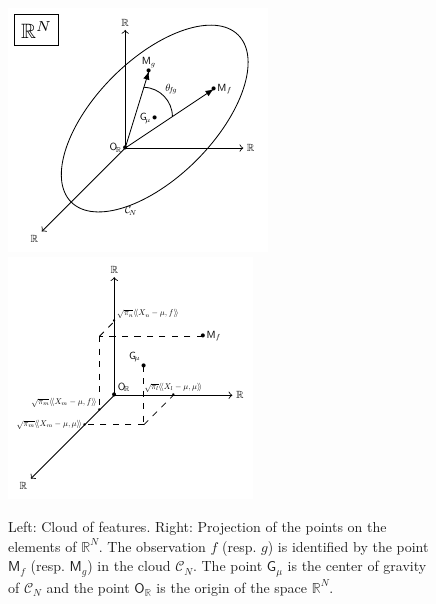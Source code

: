 \documentclass[times,sort&compress,3p]{elsarticle}
\theoremstyle{plain}%
\theoremstyle{definition}
\newcommand{\RR}{\mathbb{R}} %
\newcommand{\CN}{\mathcal{C}_{\!N}} %
\newcommand{\pfea}[1]{\mathsf{#1}} %
\newcommand{\Gfea}{\pfea{G}_{\!\mu}} %
\newcommand{\OG}{\pfea{O}_{\!\RR}} %
\begin{document}
\begin{figure}
    \centering
    \includegraphics[scale=1.2]{cloud_features.pdf}
    \includegraphics[scale=1.2]{cloud_features_proj.pdf}
    \caption{Left: Cloud of features. Right: Projection of the points on the elements of $\RR^N$. The observation $f$ (resp. $g$) is identified by the point $\pfea{M}_f$ (resp. $\pfea{M}_g$) in the cloud $\CN$. The point $\Gfea$ is the center of gravity of $\CN$ and the point $\OG$ is the origin of the space $\RR^N$.}
    \label{fig:cloud_features}
\end{figure}
\end{document}
